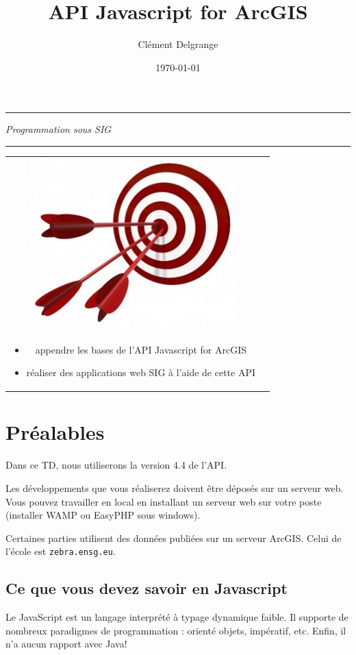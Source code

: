\documentclass[11pt]{article}
\title{API Javascript for ArcGIS}
\author{Clément Delgrange}
\date{\today}
\newenvironment{objectifs}{
	\begin{lrbox}{\mybox}
		\begin{minipage}{0.9\textwidth}
			\vspace{1em}
			\begin{tabular}[t t]{c c}
				\includegraphics[width=0.1\linewidth]{img/goals.jpg} &
				\begin{minipage}[c]{0.8\linewidth}
					\hspace{2em}\textbf{\large{Objectifs :}} \\
}{
				\end{minipage}
			\end{tabular}
			\vspace{1em}
		\end{minipage}
	\end{lrbox}
	\fbox{\usebox{\mybox}}
}
\newcommand{\code}[1]{\lstinline{#1}}
\begin{document}
\parindent=0cm

\makeatletter
\begin{center}
	\hrule
	\vspace{1em}
	{\small \textit{Programmation sous SIG}}\\	
	\vspace{0.5em}
	{\Large \bfseries{\@title}}
	\vspace{1em}
	\hrule
\end{center}
\makeatother



\begin{objectifs}
\begin{itemize}
	\item appendre les bases de l'API Javascript for ArcGIS
	\item réaliser des applications web SIG à l'aide de cette API
\end{itemize}
\end{objectifs}





\section*{Préalables}
Dans ce TD, nous utiliserons la version 4.4 de l'API.

Les développements que vous réaliserez doivent être déposés sur un serveur web. Vous pouvez travailler en local en installant un serveur web sur votre poste (installer WAMP ou EasyPHP sous windows).

Certaines parties utilisent des données publiées sur un serveur ArcGIS. Celui de l'école est \code{zebra.ensg.eu}.

\subsection*{Ce que vous devez savoir en Javascript}
Le JavaScript est un langage interprété à typage dynamique faible. Il supporte de nombreux paradigmes de programmation : orienté objets, impératif, etc. Enfin, il n'a aucun rapport avec Java!
\end{document}
